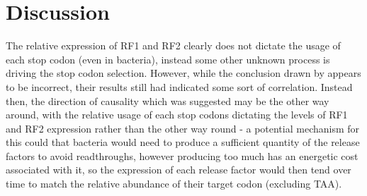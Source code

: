 \documentclass[../main.tex]{subfile}
\begin{document}
 \section{Discussion}


    The relative expression of RF1 and RF2 clearly does not dictate the usage of each stop codon (even in bacteria), instead some other unknown process is driving the stop codon selection. However, while the conclusion drawn by \autocite{PLACEHOLDER} appears to be incorrect, their results still had indicated some sort of correlation. Instead then, the direction of causality which was suggested may be the other way around, with the relative usage of each stop codons dictating the levels of RF1 and RF2 expression rather than the other way round - a potential mechanism for this could that bacteria would need to produce a sufficient quantity of the release factors to avoid readthroughs, however producing too much has an energetic cost associated with it, so the expression of each release factor would then tend over time to match the relative abundance of their target codon (excluding TAA).
\end{document}
